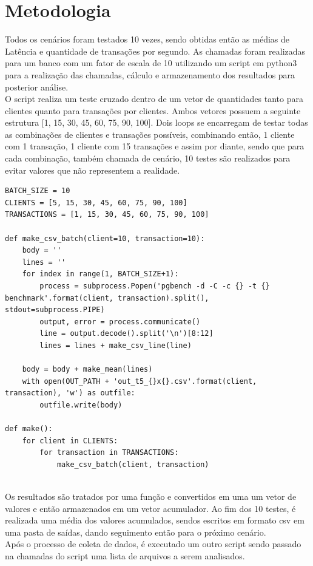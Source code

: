 \documentclass[12pt, a4paper, twoside, titlepage]{article}
\begin{document}
\section{Metodologia} \label{documentclasses}
Todos os cenários foram testados 10 vezes, sendo obtidas então as médias de Latência e quantidade de transações por segundo. As chamadas foram realizadas para um banco com um fator de escala de 10 utilizando um script em python3 para a realização das chamadas, cálculo e armazenamento dos resultados para posterior análise.
\\O script realiza um teste cruzado dentro de um vetor de quantidades tanto para clientes quanto para transações por clientes. Ambos vetores possuem a seguinte estrutura [1, 15, 30, 45, 60, 75, 90, 100]. Dois loops se encarregam de testar todas as combinações de clientes e transações possíveis, combinando então, 1 cliente com 1 transação, 1 cliente com 15 transações e assim por diante, sendo que para cada combinação, também chamada de cenário, 10 testes são realizados para evitar valores que não representem a realidade.
\\
\begin{lstlisting}
BATCH_SIZE = 10
CLIENTS = [5, 15, 30, 45, 60, 75, 90, 100]
TRANSACTIONS = [1, 15, 30, 45, 60, 75, 90, 100]

def make_csv_batch(client=10, transaction=10):
    body = ''
    lines = ''
    for index in range(1, BATCH_SIZE+1):
        process = subprocess.Popen('pgbench -d -C -c {} -t {} benchmark'.format(client, transaction).split(), stdout=subprocess.PIPE)
        output, error = process.communicate()
        line = output.decode().split('\n')[8:12]
        lines = lines + make_csv_line(line)
    
    body = body + make_mean(lines) 
    with open(OUT_PATH + 'out_t5_{}x{}.csv'.format(client, transaction), 'w') as outfile:
        outfile.write(body)

def make():
    for client in CLIENTS:
        for transaction in TRANSACTIONS:
            make_csv_batch(client, transaction)

\end{lstlisting}
\\Os resultados são tratados por uma função e convertidos em uma um vetor de valores e então armazenados em um vetor acumulador. Ao fim dos 10 testes, é realizada uma média dos valores acumulados, sendos escritos em formato csv em uma pasta de saídas, dando seguimento então para o próximo cenário.
\\Após o processo de coleta de dados, é executado um outro script sendo passado na chamadas do script uma lista de arquivos a serem analisados.\\
\end{document}
